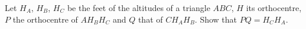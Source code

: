 Let $H_A$, $H_B$, $H_C$ be the feet of the altitudes of a triangle $ABC$, $H$ its orthocentre, $P$ the orthocentre of $AH_BH_C$ and $Q$ that of $CH_AH_B$. Show that $PQ = H_CH_A$.
